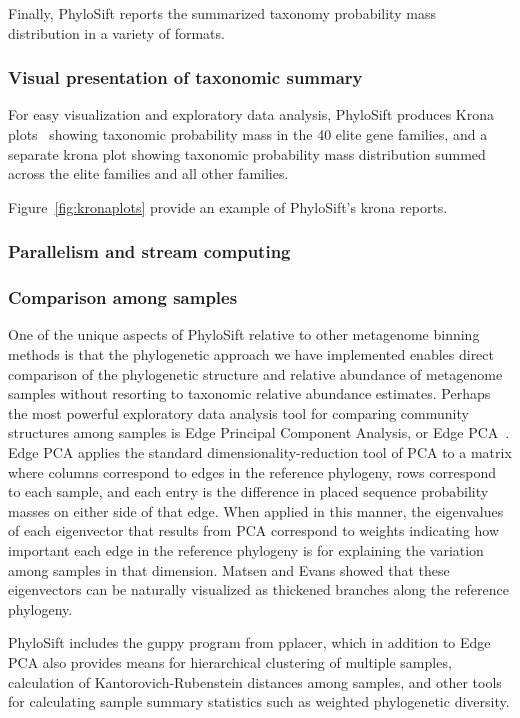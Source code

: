 \documentclass[10pt]{article}
\begin{document}
Finally, PhyloSift reports the summarized taxonomy probability mass distribution in a variety of formats.

\subsubsection*{Visual presentation of taxonomic summary}

For easy visualization and exploratory data analysis, PhyloSift produces Krona plots~\cite{krona} showing taxonomic probability mass in the 40 elite gene families, and a separate krona plot showing taxonomic probability mass distribution summed across the elite families and all other families.

Figure~\ref{fig:kronaplots} provide an example of PhyloSift's krona reports.

\subsubsection*{Parallelism and stream computing}

\subsubsection*{Comparison among samples}

One of the unique aspects of PhyloSift relative to other metagenome binning methods is that the phylogenetic approach we have implemented enables direct comparison of the phylogenetic structure and relative abundance of metagenome samples without resorting to taxonomic relative abundance estimates.
Perhaps the most powerful exploratory data analysis tool for comparing community structures among samples is Edge Principal Component Analysis, or Edge PCA~\cite{Matsen2012}.
Edge PCA applies the standard dimensionality-reduction tool of PCA to a matrix where columns correspond to edges in the reference phylogeny, rows correspond to each sample, and each entry is the difference in placed sequence probability masses on either side of that edge.
When applied in this manner, the eigenvalues of each eigenvector that results from PCA correspond to weights indicating how important each edge in the reference phylogeny is for explaining the variation among samples in that dimension.
Matsen and Evans showed that these eigenvectors can be naturally visualized as thickened branches along the reference phylogeny.

PhyloSift includes the guppy program from pplacer, which in addition to Edge PCA also provides means for hierarchical clustering of multiple samples, calculation of Kantorovich-Rubenstein distances among samples, and other tools for calculating sample summary statistics such as weighted phylogenetic diversity.
\end{document}
